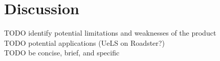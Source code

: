 \chapter{Discussion}
TODO identify potential limitations and weaknesses of the product\\
TODO potential applications (UeLS on Roadster?)\\
TODO be concise, brief, and specific\\
